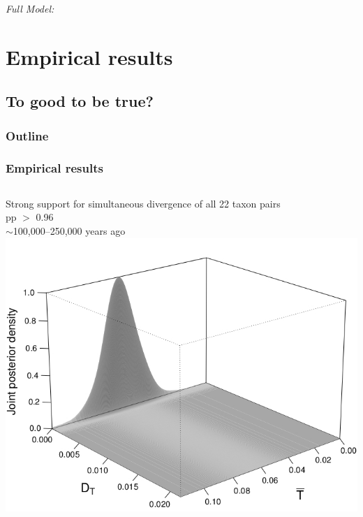 \begin{frame}[t]
\begin{onlyenv}
\begin{block}{\it Full Model:}
    \end{block}
    \end{onlyenv}
\end{frame}

\section{Empirical results}
\subsection{To good to be true?}

\begin{frame}
\frametitle{Outline}
\end{frame}

\begin{frame}
    \frametitle{Empirical results}
    \begin{columns}[c]
            {\small
            Strong support for simultaneous divergence of all 22 taxon pairs \\
            \vspace{1cm}
            pp $>$ 0.96 \\
            \vspace{1cm}
            $\sim$100,000--250,000 years ago}
        \includegraphics[width=\textwidth]{images/jointDensityPlotsSlide.jpg}
    \end{columns}
\end{frame}

